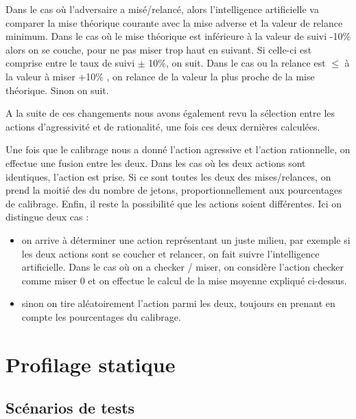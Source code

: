 \documentclass{report}
\begin{document}
Dans le cas où l'adversaire a misé/relancé, alors l'intelligence artificielle va comparer la mise théorique courante avec la mise adverse et la valeur de relance minimum. Dans le cas où le mise théorique est inférieure à la valeur de suivi -10\% alors on se couche, pour ne  pas miser trop haut en suivant. Si celle-ci est comprise entre le taux de suivi $\pm$ 10\%, on suit.
Dans le cas ou la relance est $\leq$ à la valeur à miser +10\% , on relance de la valeur la plus proche de la mise théorique. Sinon on suit.\par


A la suite de ces changements nous avons également revu la sélection entre les actions d'agressivité et de rationalité, une fois ces deux dernières calculées.\par

Une fois que le calibrage nous a donné l'action agressive et l'action rationnelle, on effectue une fusion entre les deux. Dans les cas où les deux actions sont identiques, l'action est prise. Si ce sont toutes les deux des mises/relances, on prend la moitié des du nombre de jetons, proportionnellement aux pourcentages de calibrage.
Enfin, il reste la possibilité que les actions soient différentes. Ici on distingue deux cas :
\begin{itemize}
\renewcommand{\labelitemi}{-}
\item on arrive à déterminer une action représentant un juste milieu, par exemple si les deux actions sont se coucher et relancer, on fait suivre l'intelligence artificielle. Dans le cas où on a checker / miser, on considère l'action checker comme miser 0 et on effectue le calcul de la mise moyenne expliqué ci-dessus.
\item sinon on tire aléatoirement l'action parmi les deux, toujours en prenant en compte les pourcentages du calibrage.

\end{itemize}

\section{Profilage statique}
\subsection{Scénarios de tests}
\end{document}
